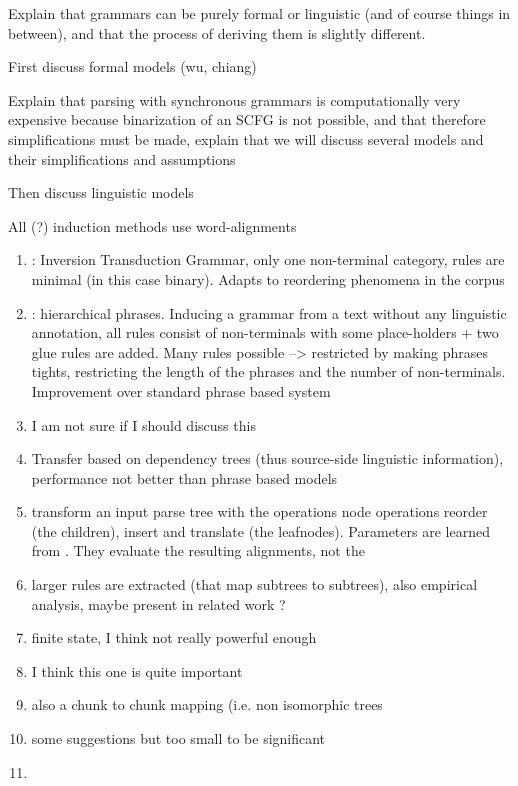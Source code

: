 \documentclass{report}
\theoremstyle{definition}
\theoremstyle{plain}
\begin{document}
Explain that grammars can be purely formal or linguistic (and of course things in between), and that the process of deriving them is slightly different.

First discuss formal models (wu, chiang)

Explain that parsing with synchronous grammars is computationally very expensive because binarization of an SCFG is not possible, and that therefore simplifications must be made, explain that we will discuss several models and their simplifications and assumptions


Then discuss linguistic models

All (?) induction methods use word-alignments


\begin{enumerate}
\item \cite{wu1997stochastic}: Inversion Transduction Grammar, only one non-terminal category, rules are minimal (in this case binary). Adapts to reordering phenomena in the corpus
\item \cite{chiang2005hierarchical}: hierarchical phrases. Inducing a grammar from a text without any linguistic annotation, all rules consist of non-terminals with some place-holders + two glue rules are added. Many rules possible --> restricted by making phrases tights, restricting the length of the phrases and the number of non-terminals. Improvement over standard phrase based system
\item \cite{melamed2004statistical} I am not sure if I should discuss this
\item \cite{lin2004path} Transfer based on dependency trees (thus source-side linguistic information), performance not better than phrase based models
\item \cite{yamada2001syntax} transform an input parse tree with the operations node operations reorder (the children), insert and translate (the leafnodes). Parameters are learned from . They evaluate the resulting alignments, not the 
\item \cite{galley2004s} larger rules are extracted (that map subtrees to subtrees), also empirical analysis, maybe present in related work ?
\item \cite{alshawi2000learning} finite state, I think not really powerful enough
\item \cite{quirk2005dependency,quirk2006dependency} I think this one is quite important
\item \cite{eisner2003learning} also a chunk to chunk mapping (i.e. non isomorphic trees
\item \cite{poutsma2000data} some suggestions but too small to be significant
\item \cite{zollmann2006syntax}
\end{enumerate}
\end{document}
